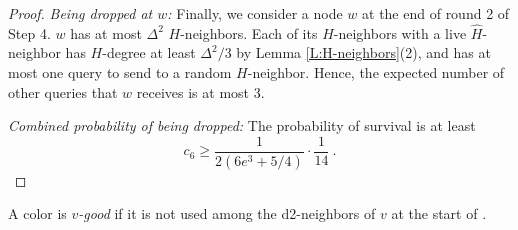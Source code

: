 \begin{proof}

\textit{Being dropped at $w$:} Finally, we consider a node $w$ at the end of round 2 of Step 4. $w$ has at most $\Delta^2$ $H$-neighbors. Each of its $H$-neighbors with a live $\hat{H}$-neighbor has $H$-degree at least $\Delta^2/3$ by Lemma \ref{L:H-neighbors}(2), and has at most one query to send to a random $H$-neighbor. Hence, the expected number of other queries that $w$ receives is at most 3. 

\textit{Combined probability of being dropped:} The probability of survival is at least 
\[c_6 \ge \frac{1}{2(6e^3 + 5/4)}\cdot \frac{1}{14} \ .  \]
\end{proof}

A color is \emph{$v$-good} if it is not used among the d2-neighbors of $v$ at the start of .

